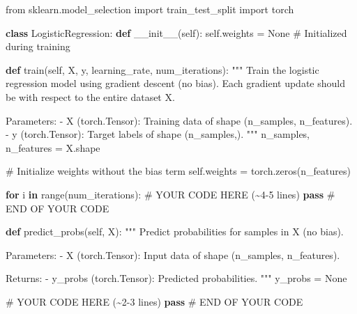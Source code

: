 \documentclass[
  letterpaper,
  DIV=11,
  numbers=noendperiod,
  oneside]{scrreprt}
\newenvironment{Shaded}{\begin{snugshade}}{\end{snugshade}}
\newcommand{\BuiltInTok}[1]{\textcolor[rgb]{0.00,0.23,0.31}{#1}}
\newcommand{\CommentTok}[1]{\textcolor[rgb]{0.37,0.37,0.37}{#1}}
\newcommand{\ControlFlowTok}[1]{\textcolor[rgb]{0.00,0.23,0.31}{\textbf{#1}}}
\newcommand{\FunctionTok}[1]{\textcolor[rgb]{0.28,0.35,0.67}{#1}}
\newcommand{\ImportTok}[1]{\textcolor[rgb]{0.00,0.46,0.62}{#1}}
\newcommand{\KeywordTok}[1]{\textcolor[rgb]{0.00,0.23,0.31}{\textbf{#1}}}
\newcommand{\NormalTok}[1]{\textcolor[rgb]{0.00,0.23,0.31}{#1}}
\newcommand{\OperatorTok}[1]{\textcolor[rgb]{0.37,0.37,0.37}{#1}}
\newcommand{\RegionMarkerTok}[1]{\textcolor[rgb]{0.00,0.23,0.31}{#1}}
\newcommand{\VariableTok}[1]{\textcolor[rgb]{0.07,0.07,0.07}{#1}}
\theoremstyle{remark}
\begin{document}
\begin{Shaded}
\begin{Highlighting}[]
\ImportTok{from}\NormalTok{ sklearn.model\_selection }\ImportTok{import}\NormalTok{ train\_test\_split}
\ImportTok{import}\NormalTok{ torch}

\KeywordTok{class}\NormalTok{ LogisticRegression:}
    \KeywordTok{def} \FunctionTok{\_\_init\_\_}\NormalTok{(}\VariableTok{self}\NormalTok{):}
        \VariableTok{self}\NormalTok{.weights }\OperatorTok{=} \VariableTok{None}  \CommentTok{\# Initialized during training}

    \KeywordTok{def}\NormalTok{ train(}\VariableTok{self}\NormalTok{, X, y, learning\_rate, num\_iterations):}
        \CommentTok{"""}
\CommentTok{        Train the logistic regression model using gradient descent (no bias).}
\CommentTok{        Each gradient update should be with respect to the entire dataset X.}

\CommentTok{        Parameters:}
\CommentTok{        {-} X (torch.Tensor): Training data of shape (n\_samples, n\_features).}
\CommentTok{        {-} y (torch.Tensor): Target labels of shape (n\_samples,).}
\CommentTok{        """}
\NormalTok{        n\_samples, n\_features }\OperatorTok{=}\NormalTok{ X.shape}

        \CommentTok{\# Initialize weights without the bias term}
        \VariableTok{self}\NormalTok{.weights }\OperatorTok{=}\NormalTok{ torch.zeros(n\_features)}

        \ControlFlowTok{for}\NormalTok{ i }\KeywordTok{in} \BuiltInTok{range}\NormalTok{(num\_iterations):}
            \CommentTok{\# YOUR CODE HERE (\textasciitilde{}4{-}5 lines)}
                \ControlFlowTok{pass}
            \CommentTok{\# }\RegionMarkerTok{END}\CommentTok{ OF YOUR CODE}

    \KeywordTok{def}\NormalTok{ predict\_probs(}\VariableTok{self}\NormalTok{, X):}
        \CommentTok{"""}
\CommentTok{        Predict probabilities for samples in X (no bias).}

\CommentTok{        Parameters:}
\CommentTok{        {-} X (torch.Tensor): Input data of shape (n\_samples, n\_features).}

\CommentTok{        Returns:}
\CommentTok{        {-} y\_probs (torch.Tensor): Predicted probabilities.}
\CommentTok{        """}
\NormalTok{        y\_probs }\OperatorTok{=} \VariableTok{None}

        \CommentTok{\# YOUR CODE HERE (\textasciitilde{}2{-}3 lines)}
        \ControlFlowTok{pass}
        \CommentTok{\# }\RegionMarkerTok{END}\CommentTok{ OF YOUR CODE}


\end{Highlighting}
\end{Shaded}
\end{document}

